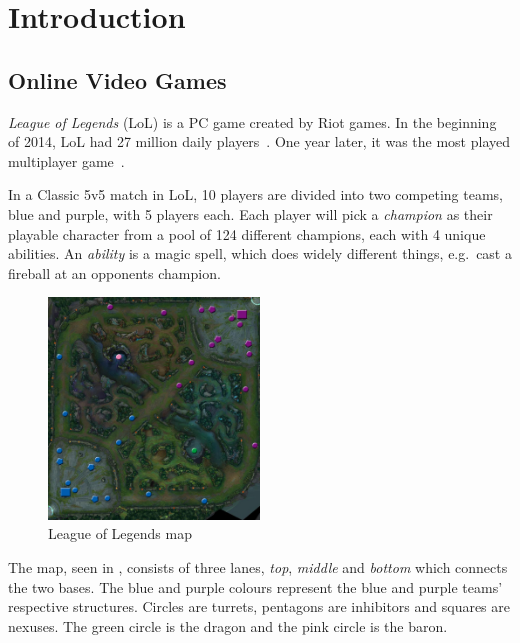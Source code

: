 \section{Introduction}\label{sec:intro}
\subsection{Online Video Games}\label{sec:onlinevideogames}
\emph{League of Legends} (LoL) is a PC game created by Riot games. In the beginning of 2014, LoL had 27 million daily players~\cite{LoL27mill}. One year later, it was the most played multiplayer game~\cite{LoLmostplayed}.

In a Classic 5v5 match in LoL, 10 players are divided into two competing teams, blue and purple, with 5 players each. Each player will pick a \emph{champion} as their playable character from a pool of 124 different champions, each with 4 unique abilities. An \emph{ability} is a magic spell, which does widely different things, e.g.\ cast a fireball at an opponents champion.

\begin{figure}[!htb]
  \centering
    \includegraphics[width=0.5\textwidth]{img/lolmap.jpg}
  \caption{League of Legends map~\cite{lolmap}}\label{fig:lolmap}
\end{figure}

The map, seen in , consists of three lanes, \emph{top}, \emph{middle} and \emph{bottom} which connects the two bases. The blue and purple colours represent the blue and purple teams' respective structures. Circles are turrets, pentagons are inhibitors and squares are nexuses. The green circle is the dragon and the pink circle is the baron.

